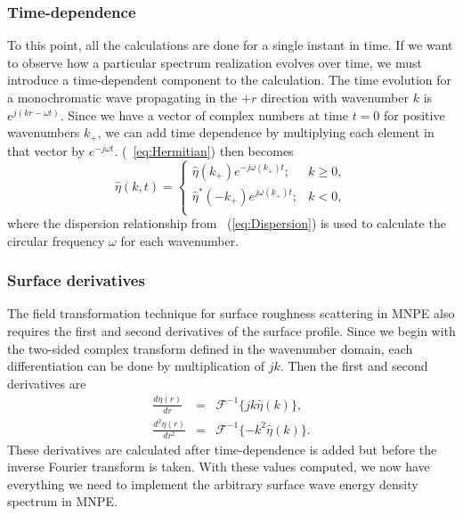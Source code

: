\subsubsection{Time-dependence}

To this point, all the calculations are done for a single instant in time. If we want to observe how a particular spectrum realization evolves over time, we must introduce a time-dependent component to the calculation. The time evolution for a monochromatic wave propagating in the $+r$ direction with wavenumber $k$ is $e^{j(kr-\omega{t})}$. Since we have a vector of complex numbers at time $t=0$ for positive wavenumbers $k_+$, we can add time dependence by multiplying each element in that vector by $e^{-j\omega{t}}$. \equationname(~\ref{eq:Hermitian}) then becomes 
\begin{equation}
\hat{\eta}(k,t) = 
\begin{cases}
\hat{\eta}(k_+)e^{-j\omega(k_+)t}; & k\ge 0, \\
\hat{\eta}^*(-k_+)e^{j\omega(k_+)t}; & k< 0, \\
\end{cases}\label{eq:HermitianTime}
\end{equation}
where the dispersion relationship from \eqnname~(\ref{eq:Dispersion}) is used to calculate the circular frequency $\omega$ for each wavenumber. 

\subsubsection{Surface derivatives}

The field transformation technique\cite{Tappert} for surface roughness scattering in MNPE also requires the first and second derivatives of the surface profile. Since we begin with the two-sided complex transform defined in the wavenumber domain, each differentiation can be done by multiplication of $jk$. Then the first and second derivatives are
\begin{eqnarray}
\frac{d\eta(r)}{dr} & = & \mathcal{F}^{-1}\{jk\hat{\eta}(k)\}, \\
\frac{d^2\eta(r)}{dr^2} & = & \mathcal{F}^{-1}\{-k^2\hat{\eta}(k)\}.
\end{eqnarray}
These derivatives are calculated after time-dependence is added but before the inverse Fourier transform is taken. With these values computed, we now have everything we need to implement the arbitrary surface wave energy density spectrum in MNPE.
